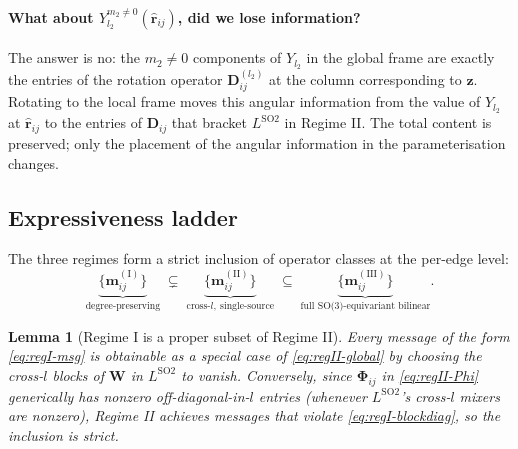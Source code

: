 \documentclass[11pt,a4paper]{article}
\newcommand{\brh}{\hat{\bm{r}}}
\newcommand{\bz}{\bm{z}}
\newcommand{\bD}{\bm{D}}
\theoremstyle{plain}
\newtheorem{lemma}[theorem]{Lemma}
\theoremstyle{definition}
\theoremstyle{remark}
\begin{document}
    \paragraph{What about $Y_{l_2}^{m_2\ne 0}(\brh_{ij})$, did we lose information?}
    The answer is no: the $m_2\ne 0$ components of $Y_{l_2}$ in the global frame are exactly the entries of the rotation operator $\bD_{ij}^{(l_2)}$ at the column corresponding to $\bz$.
    Rotating to the local frame moves this angular information from the value of $Y_{l_2}$ at $\brh_{ij}$ to the entries of $\bD_{ij}$ that bracket $L^{\mathrm{SO2}}$ in Regime II.
    The total content is preserved; only the placement of the angular information in the parameterisation changes.

    \subsection{Expressiveness ladder}\label{sec:expr-ladder}

    The three regimes form a strict inclusion of operator classes at the per-edge
    level:
    \begin{equation}\label{eq:ladder}
        \underbrace{\bigl\{\bm{m}_{ij}^{\mathrm{(I)}}\bigr\}}_{\text{degree-preserving}}
        \;\subsetneq\;
        \underbrace{\bigl\{\bm{m}_{ij}^{\mathrm{(II)}}\bigr\}}_{\text{cross-}l,\ \text{single-source}}
        \;\subseteq\;
        \underbrace{\bigl\{\bm{m}_{ij}^{\mathrm{(III)}}\bigr\}}_{\text{full SO(3)-equivariant bilinear}}.
    \end{equation}

    \begin{lemma}[Regime I is a proper subset of Regime II]
    Every message of the form \eqref{eq:regI-msg} is obtainable as a special case of \eqref{eq:regII-global} by choosing the cross-$l$ blocks of $\bm{W}$ in $L^{\mathrm{SO2}}$ to vanish.
    Conversely, since $\bm{\Phi}_{ij}$ in \eqref{eq:regII-Phi} generically has nonzero off-diagonal-in-$l$ entries (whenever $L^{\mathrm{SO2}}$'s cross-$l$ mixers are nonzero), Regime II achieves messages that violate \eqref{eq:regI-blockdiag}, so the inclusion is strict.
    \end{lemma}
\end{document}
